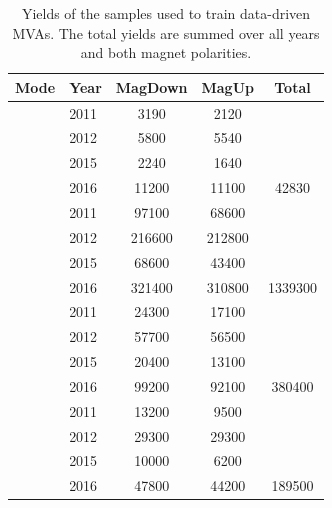 \begin{table}[!h]
   \centering
      \begin{tabular}{ll S[table-format=6.0(4)] S[table-format=6.0(4)] S[table-format=7.0(4)]}
         \hline
         Mode                       & Year   & {MagDown}          & {MagUp}           & {Total} \\ 
         \hline                                                
         \decay{\phiz}{\Kp\Km}      & 2011   & 3190      &   2120   &    \\
                                    & 2012   & 5800      &   5540   &     \\
                                    & 2015   & 2240      &   1640   &     \\
                                    & 2016   & 11200     &   11100  & 42830     \\
         \hline                                                
         \decay{\Dsp}{\Kp\Km\pip}   & 2011   & 97100     & 68600    &     \\
                                    & 2012   & 216600    & 212800   &     \\
                                    & 2015   & 68600     & 43400    &     \\
                                    & 2016   & 321400    & 310800   & 1339300     \\
         \hline                                                
         \decay{\Dsp}{\pip\pim\pip} & 2011   & 24300     &   17100  &      \\
                                    & 2012   & 57700     &   56500  &     \\
                                    & 2015   & 20400     &   13100  &     \\
                                    & 2016   & 99200    &  92100  & 380400     \\
         \hline                                                
         \decay{\Dsp}{\Kp\pim\pip}  & 2011   & 13200     & 9500     &     \\
                                    & 2012   & 29300     & 29300    &     \\
                                    & 2015   & 10000     & 6200     &     \\
                                    & 2016   & 47800    & 44200   & 189500     \\
         \hline
      \end{tabular}
      \caption{Yields of the samples used to train data-driven MVAs. The total yields are summed over all years and both magnet polarities.}
      \label{table:mva_training_yields}
   
\end{table}

